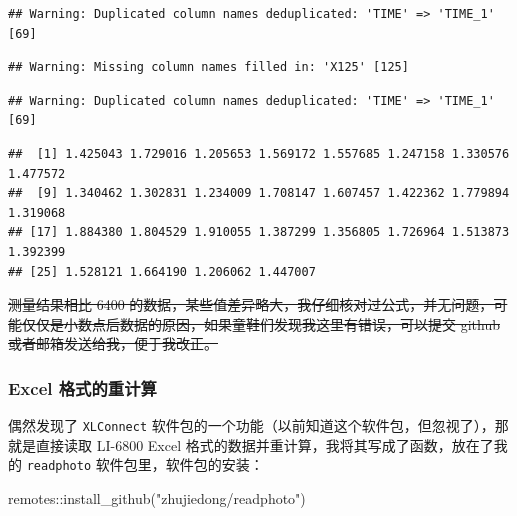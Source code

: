 \documentclass[
]{krantz}
\makeatletter
\newenvironment{Shaded}{\begin{snugshade}}{\end{snugshade}}
\newcommand{\FunctionTok}[1]{\textcolor[rgb]{0.00,0.00,0.00}{#1}}
\newcommand{\NormalTok}[1]{#1}
\newcommand{\SpecialCharTok}[1]{\textcolor[rgb]{0.00,0.00,0.00}{#1}}
\newcommand{\StringTok}[1]{\textcolor[rgb]{0.31,0.60,0.02}{#1}}
\newenvironment{kframe}{%
\medskip{}
\setlength{\fboxsep}{.8em}
 \def\at@end@of@kframe{}%
 \ifinner\ifhmode%
  \def\at@end@of@kframe{\end{minipage}}%
  \begin{minipage}{\columnwidth}%
 \fi\fi%
 \def\FrameCommand##1{\hskip\@totalleftmargin \hskip-\fboxsep
 \colorbox{shadecolor}{##1}\hskip-\fboxsep
     \hskip-\linewidth \hskip-\@totalleftmargin \hskip\columnwidth}%
 \MakeFramed {\advance\hsize-\width
   \@totalleftmargin\z@ \linewidth\hsize
   \@setminipage}}%
 {\par\unskip\endMakeFramed%
 \at@end@of@kframe}
\renewenvironment{Shaded}{\begin{kframe}}{\end{kframe}}
\makeatother
\begin{document}
\begin{verbatim}
## Warning: Duplicated column names deduplicated: 'TIME' => 'TIME_1' [69]
\end{verbatim}

\begin{verbatim}
## Warning: Missing column names filled in: 'X125' [125]
\end{verbatim}

\begin{verbatim}
## Warning: Duplicated column names deduplicated: 'TIME' => 'TIME_1' [69]
\end{verbatim}

\begin{Shaded}
\end{Shaded}

\begin{verbatim}
##  [1] 1.425043 1.729016 1.205653 1.569172 1.557685 1.247158 1.330576 1.477572
##  [9] 1.340462 1.302831 1.234009 1.708147 1.607457 1.422362 1.779894 1.319068
## [17] 1.884380 1.804529 1.910055 1.387299 1.356805 1.726964 1.513873 1.392399
## [25] 1.528121 1.664190 1.206062 1.447007
\end{verbatim}

\sout{测量结果相比 6400 的数据，某些值差异略大，我仔细核对过公式，并无问题，可能仅仅是小数点后数据的原因，如果童鞋们发现我这里有错误，可以提交 github 或者邮箱发送给我，便于我改正。}

\hypertarget{excel-recompute-68}{%
\subsubsection{Excel 格式的重计算}\label{excel-recompute-68}}

偶然发现了 \texttt{XLConnect} 软件包的一个功能（以前知道这个软件包，但忽视了），那就是直接读取 LI-6800 Excel 格式的数据并重计算，我将其写成了函数，放在了我的 \texttt{readphoto} 软件包里，软件包的安装：

\begin{Shaded}
\begin{Highlighting}[]
\NormalTok{remotes}\SpecialCharTok{::}\FunctionTok{install\_github}\NormalTok{(}\StringTok{"zhujiedong/readphoto"}\NormalTok{)}
\end{Highlighting}
\end{Shaded}
\end{document}
